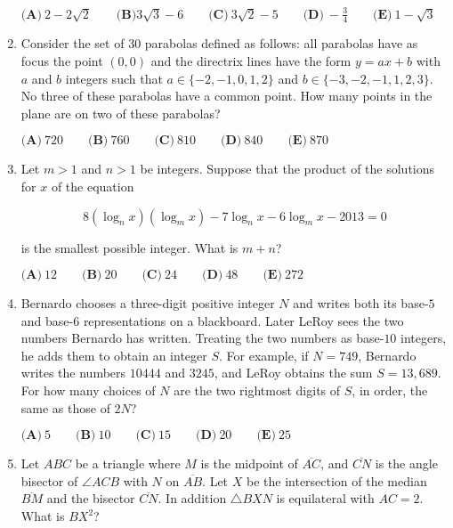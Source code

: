 \documentclass{article}
\begin{document}
\begin{enumerate}[label=\arabic*., itemsep=0.5em]
$ \textbf{(A)}\ 2-2\sqrt{2}\qquad\textbf{(B)} 3\sqrt{3}-6\qquad\textbf{(C)}\ 3\sqrt{2}-5\qquad\textbf{(D)}\ -\frac{3}{4}\qquad\textbf{(E)}\ 1-\sqrt{3}$\par \vspace{0.5em}\item Consider the set of $30$ parabolas defined as follows: all parabolas have as focus the point $(0,0)$ and the directrix lines have the form $y=ax+b$ with $a$ and $b$ integers such that $a\in \{-2,-1,0,1,2\}$ and $b\in \{-3,-2,-1,1,2,3\}$. No three of these parabolas have a common point. How many points in the plane are on two of these parabolas?

$ \textbf{(A)}\ 720\qquad\textbf{(B)}\ 760\qquad\textbf{(C)}\ 810\qquad\textbf{(D)}\ 840\qquad\textbf{(E)}\ 870 $\par \vspace{0.5em}\item Let $m>1$ and $n>1$ be integers. Suppose that the product of the solutions for $x$ of the equation

\begin{equation*}
8(\log_n x)(\log_m x)-7\log_n x-6 \log_m x-2013 = 0
\end{equation*}

is the smallest possible integer. What is $m+n$?

$ \textbf{(A)}\ 12\qquad\textbf{(B)}\ 20\qquad\textbf{(C)}\ 24\qquad\textbf{(D)}\ 48\qquad\textbf{(E)}\ 272 $\par \vspace{0.5em}\item Bernardo chooses a three-digit positive integer $N$ and writes both its base-$5$ and base-$6$ representations on a blackboard. Later LeRoy sees the two numbers Bernardo has written. Treating the two numbers as base-$10$ integers, he adds them to obtain an integer $S$. For example, if $N=749$, Bernardo writes the numbers $10444$ and $3245$, and LeRoy obtains the sum $S=13,689$. For how many choices of $N$ are the two rightmost digits of $S$, in order, the same as those of $2N$?

$ \textbf{(A)}\ 5\qquad\textbf{(B)}\ 10\qquad\textbf{(C)}\ 15\qquad\textbf{(D)}\ 20\qquad\textbf{(E)}\ 25 $\par \vspace{0.5em}\item Let $ABC$ be a triangle where $M$ is the midpoint of $\overline{AC}$, and $\overline{CN}$ is the angle bisector of $\angle{ACB}$ with $N$ on $\overline{AB}$. Let $X$ be the intersection of the median $\overline{BM}$ and the bisector $\overline{CN}$. In addition $\triangle BXN$ is equilateral with $AC=2$. What is $BX^2$?


\end{enumerate}
\end{document}
